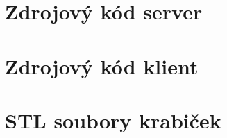 \appendix
\section{Zdrojový kód server}
\notFinished

\newpage
\section{Zdrojový kód klient}
\notFinished

\newpage
\section{STL soubory krabiček}
\notFinished

